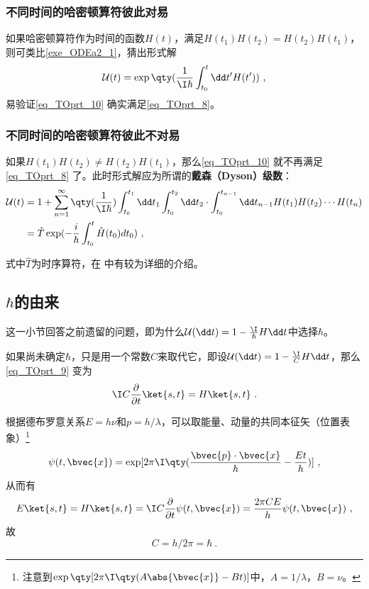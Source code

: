\subsubsection{不同时间的哈密顿算符彼此对易}

如果哈密顿算符作为时间的函数$H(t)$，满足$H(t_1)H(t_2)=H(t_2)H(t_1)$，则可类比\autoref{exe_ODEa2_1}，猜出形式解
\begin{equation}\label{eq_TOprt_10}
\mathcal{U}(t)=\exp\qty(\frac{1}{\I\hbar}\int^t_{t_0}\dd t' H(t'))~,
\end{equation}
易验证\autoref{eq_TOprt_10} 确实满足\autoref{eq_TOprt_8}。



\subsubsection{不同时间的哈密顿算符彼此不对易}

如果$H(t_1)H(t_2)\not=H(t_2)H(t_1)$，那么\autoref{eq_TOprt_10} 就不再满足\autoref{eq_TOprt_8} 了。此时形式解应为所谓的\textbf{戴森（Dyson）级数}：
\begin{align}
\mathcal{U}(t) &= 1+\sum_{n=1}^\infty \qty(\frac{1}{\I \hbar})\int^{t_1}_{t_0}\dd t_1\int^{t_2}_{t_0}\dd t_2\cdot \int^{t_{n-1}}_{t_0}\dd t_{n-1}H(t_1)H(t_2)\cdots H(t_n) \\
&=\hat T \exp(-\frac{i}{\hbar}\int^t_{t_0}\hat H(t_0)dt_0)~,
\end{align}

式中$\hat T$为时序算符，在 中有较为详细的介绍。

\subsection{$\hbar$的由来}\label{sub_TOprt_1}

这一小节回答之前遗留的问题，即为什么$\mathcal{U}(\dd t) = 1-\frac{\I}{\hbar} H \dd t$中选择$\hbar$。

如果尚未确定$\hbar$，只是用一个常数$C$来取代它，即设$\mathcal{U}(\dd t) = 1-\frac{\I}{C} H \dd t$，那么\autoref{eq_TOprt_9} 变为
\begin{equation}
\I C\frac{\partial}{\partial t}\ket{s, t}=H\ket{s, t}~.
\end{equation}

根据德布罗意关系$E=h\nu$和$p=h/\lambda$，可以取能量、动量的共同本征矢（位置表象）\footnote{注意到$\exp\qty[2\pi \I \qty(A\abs{\bvec{x}}-Bt)]$中，$A=1/\lambda$，$B=\nu$。}
\begin{equation}
\psi(t, \bvec{x})=\exp[2\pi\I\qty(\frac{\bvec{p}\cdot\bvec{x}}{h}-\frac{Et}{h})]~,
\end{equation}
从而有
\begin{equation}
E\ket{s, t}=H\ket{s, t}=\I C\frac{\partial}{\partial t}\psi(t, \bvec{x}) = \frac{2\pi C E}{h} \psi(t, \bvec{x})~,
\end{equation}
故
\begin{equation}
C=h/2\pi=\hbar~.
\end{equation}








